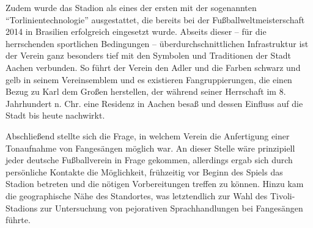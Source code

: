 Zudem wurde das Stadion als eines der ersten mit der sogenannten "`Torlinientechnologie"' ausgestattet, die bereits bei der Fußballweltmeisterschaft 2014 in Brasilien erfolgreich eingesetzt wurde.
Abseits dieser – für die herrschenden sportlichen Bedingungen – überdurchschnittlichen Infrastruktur ist der Verein ganz besonders tief mit den Symbolen und Traditionen der Stadt Aachen verbunden.
So führt der Verein den Adler und die Farben schwarz und gelb in seinem Vereinsemblem und es existieren Fangruppierungen, die einen Bezug zu Karl dem Großen herstellen, der während seiner Herrschaft im 8. Jahrhundert n. Chr. eine Residenz in Aachen besaß und dessen Einfluss auf die Stadt bis heute nachwirkt.

Abschließend stellte sich die Frage, in welchem Verein die Anfertigung einer Tonaufnahme von Fangesängen möglich war.
An dieser Stelle wäre prinzipiell jeder deutsche Fußballverein in Frage gekommen, allerdings ergab sich durch persönliche Kontakte die Möglichkeit, frühzeitig vor Beginn des Spiels das Stadion betreten und die nötigen Vorbereitungen treffen zu können.
Hinzu kam die geographische Nähe des Standortes, was letztendlich zur Wahl des Tivoli-Stadions zur Untersuchung von pejorativen Sprachhandlungen bei Fangesängen führte.